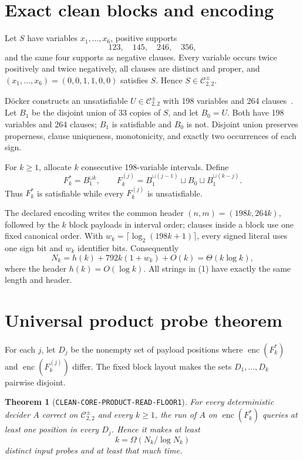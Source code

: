 \documentclass[11pt]{article}
\newtheorem{theorem}{Theorem}
\newcommand{\Core}{\mathcal C_{2,2}^{\pm}}
\begin{document}
\section{Exact clean blocks and encoding}
Let \(S\) have variables \(x_1,\ldots,x_6\), positive supports
\[
 123,\quad145,\quad246,\quad356,
\]
and the same four supports as negative clauses.  Every variable occurs twice
positively and twice negatively, all clauses are distinct and proper, and
\((x_1,\ldots,x_6)=(0,0,1,1,0,0)\) satisfies \(S\).  Hence \(S\in\Core\).

Döcker constructs an unsatisfiable \(U\in\Core\) with 198 variables and 264
clauses~\cite[Proposition~1]{Doecker19}.  Let \(B_1\) be the disjoint union of
33 copies of \(S\), and let \(B_0=U\).  Both have 198 variables and 264
clauses; \(B_1\) is satisfiable and \(B_0\) is not.  Disjoint union preserves
properness, clause uniqueness, monotonicity, and exactly two occurrences of
each sign.

For \(k\ge1\), allocate \(k\) consecutive 198-variable intervals.  Define
\[
 F_k^*=B_1^{\sqcup k},\qquad
 F_k^{(j)}=B_1^{\sqcup(j-1)}\sqcup B_0\sqcup
 B_1^{\sqcup(k-j)}.                                      \tag{1}
\]
Thus \(F_k^*\) is satisfiable while every \(F_k^{(j)}\) is unsatisfiable.

The declared encoding writes the common header
\((n,m)=(198k,264k)\), followed by the \(k\) block payloads in interval order;
clauses inside a block use one fixed canonical order.  With
\(w_k=\lceil\log_2(198k+1)\rceil\), every signed literal uses one sign bit and
\(w_k\) identifier bits.  Consequently
\[
 N_k=h(k)+792k(1+w_k)+O(k)=\Theta(k\log k),                \tag{2}
\]
where the header \(h(k)=O(\log k)\).  All strings in (1) have exactly the same
length and header.

\section{Universal product probe theorem}
For each \(j\), let \(D_j\) be the nonempty set of payload positions where
\(\operatorname{enc}(F_k^*)\) and
\(\operatorname{enc}(F_k^{(j)})\) differ.  The fixed block layout makes the
sets \(D_1,\ldots,D_k\) pairwise disjoint.

\begin{theorem}[\texttt{CLEAN-CORE-PRODUCT-READ-FLOOR1}]
For every deterministic decider \(A\) correct on \(\Core\) and every
\(k\ge1\), the run of \(A\) on \(\operatorname{enc}(F_k^*)\) queries at least
one position in every \(D_j\).  Hence it makes at least
\[
 k=\Omega(N_k/\log N_k)                                  \tag{3}
\]
distinct input probes and at least that much time.
\end{theorem}
\end{document}
